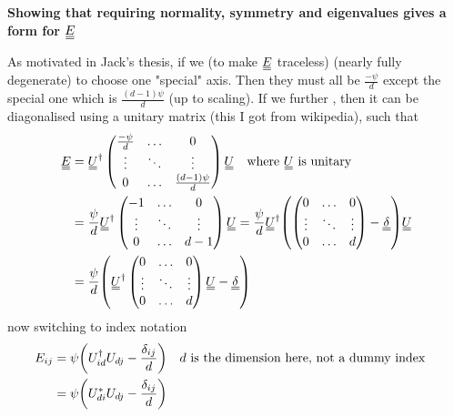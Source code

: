 \documentclass[11pt]{article}
\begin{document}
\begin{center}
    \LARGE
    \textbf{Showing that requiring normality, symmetry and eigenvalues gives a form for $\du{E}$}
\end{center}
\vspace{1em}

As motivated in Jack's thesis, if we  (to make $\du{E}$ traceless)  (nearly fully degenerate) to choose one "special" axis.
Then they must all be $\frac{-\psi}{d}$ except the special one which is $\frac{(d-1)\psi}{d}$ (up to scaling).
If we further , then it can be diagonalised using a unitary matrix (this I got from wikipedia), such that
\begin{align}
    \du{E} &= \du{U}^\dagger \begin{pmatrix}
        \frac{-\psi}{d} & \dots & 0 \\
        \vdots & \ddots & \vdots\\
        0 & \dots & \frac{(d-1)\psi}{d}
    \end{pmatrix} \du{U} \qq{where $\du{U}$ is unitary} \\
    &= \frac{\psi}{d} \du{U}^\dagger \begin{pmatrix}
        -1 & \dots & 0 \\
        \vdots & \ddots & \vdots\\
        0 & \dots & d-1
    \end{pmatrix} \du{U} = \frac{\psi}{d} \du{U}^\dagger \qty(\begin{pmatrix}
        0 & \dots & 0 \\
        \vdots & \ddots & \vdots\\
        0 & \dots & d
    \end{pmatrix} - \du{\delta}) \du{U} \\
    &= \frac{\psi}{d} \qty(\du{U}^\dagger \begin{pmatrix}
        0 & \dots & 0 \\
        \vdots & \ddots & \vdots\\
        0 & \dots & d
    \end{pmatrix} \du{U} - \du{\delta}) \\
\end{align}
now switching to index notation
\begin{align}
    E_{ij} &= \psi \qty(U^\dagger_{id}U_{dj} - \frac{\delta_{ij}}{d}) \qq{$d$ is the dimension here, not a dummy index} \\
    &= \psi \qty(U^*_{di}U_{dj} - \frac{\delta_{ij}}{d})
\end{align}
\end{document}
